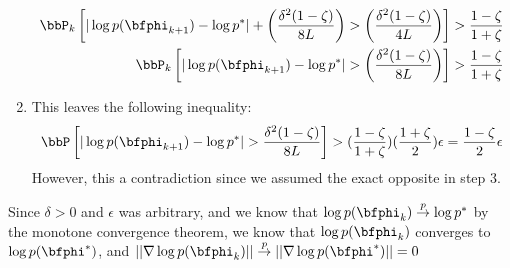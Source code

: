 \begin{enumerate}
\begin{align*}
        \bbP_k\left[|\log p(\bfphi_{k+1}) -\log p^*| + \left(\frac{\delta^2(1-\zeta)}{8L}\right) >  \left(\frac{\delta^2(1-\zeta)}{4L}\right) \right] &> \frac{1-\zeta}{1+\zeta} \\
        \bbP_k\left[|\log p(\bfphi_{k+1}) - \log p^*| >  \left(\frac{\delta^2(1-\zeta)}{8L}\right) \right] &> \frac{1-\zeta}{1+\zeta}
    \end{align*}
    \item This leaves the following inequality:
    \begin{equation}
        \bbP\left[|\log p(\bfphi_{k+1}) - \log p^*| > \frac{\delta^2(1-\zeta)}{8L} \right] > (\frac{1-\zeta}{1+\zeta})(\frac{1+\zeta}{2})\epsilon = \frac{1-\zeta}{2} \epsilon \label{eqn:eps_2}
    \end{equation}
    However, this a contradiction since we assumed the exact opposite in step 3.
\end{enumerate}

Since $\delta > 0$ and $\epsilon$ was arbitrary, and we know that $\log p(\bfphi_k) \overset{p}{\to} \log p^*$ by the monotone convergence theorem, we know that $\log p(\bfphi_k)$ converges to $\log p(\bfphi^*)$, and $||\nabla \log p(\bfphi_k)|| \overset{p}{\to}||\nabla \log p(\bfphi^*)|| = 0$
